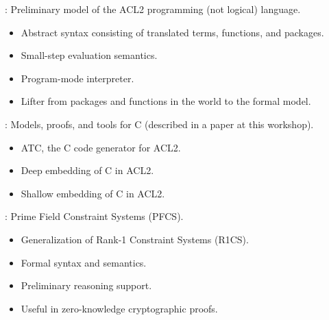 
\begin{frame}[fragile]

\newlibtitle

:
Preliminary model of the ACL2 programming (not logical) language.
\begin{itemize}
\item Abstract syntax consisting of translated terms, functions, and packages.
\item Small-step evaluation semantics.
\item Program-mode interpreter.
\item Lifter from packages and functions in the world to the formal model.
\end{itemize}

\end{frame}


\begin{frame}

\newlibtitle

:
Models, proofs, and tools for C (described in a paper at this workshop).
\begin{itemize}
\item ATC, the C code generator for ACL2.
\item Deep embedding of C in ACL2.
\item Shallow embedding of C in ACL2.
\end{itemize}

\end{frame}


\begin{frame}

\newlibtitle

:
Prime Field Constraint Systems (PFCS).
\begin{itemize}
\item Generalization of Rank-1 Constraint Systems (R1CS).
\item Formal syntax and semantics.
\item Preliminary reasoning support.
\item Useful in zero-knowledge cryptographic proofs.
\end{itemize}

\end{frame}

